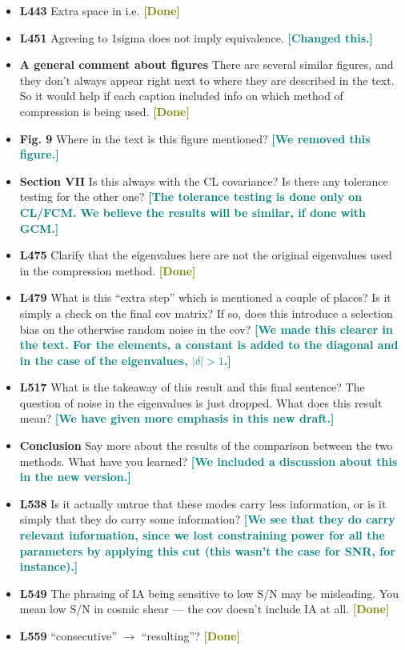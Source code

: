 \documentclass{article}
\newcommand\reply[1]{{\bf {\textcolor{teal}{[#1]}}}}
\newcommand\done{{\bf {\textcolor{olive}{[Done]}}}}
\begin{document}
\begin{itemize}
		\item \textbf{L443} Extra space in i.e. \done
		\item \textbf{L451} Agreeing to 1sigma does not imply equivalence. \reply{Changed this.}
		\item \textbf{A general comment about figures} There are several similar figures, and they don’t always appear right next to where they are described in the text. So it would help if each caption included info on which method of compression is being used. \done
		\item \textbf{Fig. 9} Where in the text is this figure mentioned? \reply{We removed this figure.}
		\item \textbf{Section VII} Is this always with the CL covariance? Is there any tolerance testing for the other one? \reply{The tolerance testing is done only on CL/FCM. We believe the results will be similar, if done with GCM.}
		\item \textbf{L475} Clarify that the eigenvalues here are not the original eigenvalues used in the compression method. \done
		\item \textbf{L479} What is this “extra step” which is mentioned a couple of places? Is it simply a check on the final cov matrix? If so, does this introduce a selection bias on the otherwise random noise in the cov? \reply{We made this clearer in the text. For the elements, a constant is added to the diagonal and in the case of the eigenvalues, $|\delta| > 1$.}
		\item \textbf{L517} What is the takeaway of this result and this final sentence? The question of noise in the eigenvalues is just dropped. What does this result mean? \reply{We have given more emphasis in this new draft.}
		\item \textbf{Conclusion} Say more about the results of the comparison between the two methods. What have you learned? \reply{We included a discussion about this in the new version.}
		\item \textbf{L538} Is it actually untrue that these modes carry less information, or is it simply that they do carry some information? \reply{We see that they do carry relevant information, since we lost constraining power for all the parameters by applying this cut (this wasn't the case for SNR, for instance).}
		\item \textbf{L549} The phrasing of IA being sensitive to low S/N may be misleading. You mean low S/N in cosmic shear — the cov doesn’t include IA at all. \done
		\item \textbf{L559} “consecutive” $\rightarrow$ “resulting”? \done

\end{itemize}
\end{document}
